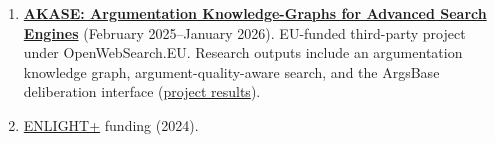 
\begin{enumerate}
\item \textbf{\href{https://openwebsearch.eu/third-party-projects/owseu-project-akase/}{AKASE: Argumentation Knowledge-Graphs for Advanced Search Engines}} (February 2025--January 2026). EU-funded third-party project under OpenWebSearch.EU. Research outputs include an argumentation knowledge graph, argument-quality-aware search, and the ArgsBase deliberation interface (\href{https://openwebsearch.eu/category/third-party-project-results/}{project results}).
\item \href{https://enlight-eu.org}{ENLIGHT+} funding (2024).
\end{enumerate}
